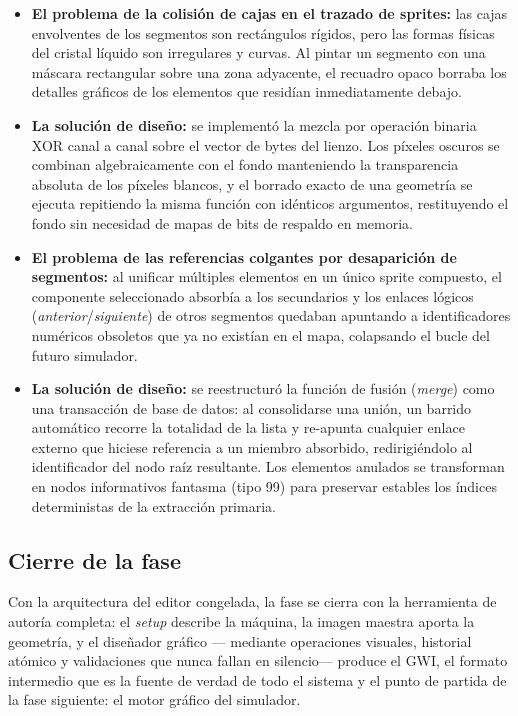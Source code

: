 \begin{itemize}
	\item \textbf{El problema de la colisión de cajas en el trazado de
		sprites:} las cajas envolventes de los segmentos son rectángulos
	rígidos, pero las formas físicas del cristal líquido son irregulares y
	curvas. Al pintar un segmento con una máscara rectangular sobre una
	zona adyacente, el recuadro opaco borraba los detalles gráficos de
	los elementos que residían inmediatamente debajo.
	\item \textbf{La solución de diseño:} se implementó la mezcla por
	operación binaria XOR canal a canal sobre el vector de bytes del
	lienzo. Los píxeles oscuros se combinan algebraicamente con el fondo
	manteniendo la transparencia absoluta de los píxeles blancos, y el
	borrado exacto de una geometría se ejecuta repitiendo la misma
	función con idénticos argumentos, restituyendo el fondo sin necesidad
	de mapas de bits de respaldo en memoria.
	\item \textbf{El problema de las referencias colgantes por
		desaparición de segmentos:} al unificar múltiples elementos en un
	único sprite compuesto, el componente seleccionado absorbía a los
	secundarios y los enlaces lógicos (\emph{anterior}/\emph{siguiente})
	de otros segmentos quedaban apuntando a identificadores numéricos
	obsoletos que ya no existían en el mapa, colapsando el bucle del
	futuro simulador.
	\item \textbf{La solución de diseño:} se reestructuró la función de
	fusión (\emph{merge}) como una transacción de base de datos: al
	consolidarse una unión, un barrido automático recorre la totalidad de
	la lista y re-apunta cualquier enlace externo que hiciese referencia a
	un miembro absorbido, redirigiéndolo al identificador del nodo raíz
	resultante. Los elementos anulados se transforman en nodos
	informativos fantasma (tipo 99) para preservar estables los índices
	deterministas de la extracción primaria.
\end{itemize}

\subsection{Cierre de la fase}
\label{sec:F1Cierre}

Con la arquitectura del editor congelada, la fase se cierra con la
herramienta de autoría completa: el \emph{setup} describe la máquina,
la imagen maestra aporta la geometría, y el diseñador gráfico —
mediante operaciones visuales, historial atómico y validaciones que
nunca fallan en silencio— produce el GWI, el formato intermedio que
es la fuente de verdad de todo el sistema y el punto de partida de la
fase siguiente: el motor gráfico del simulador.
\clearpage